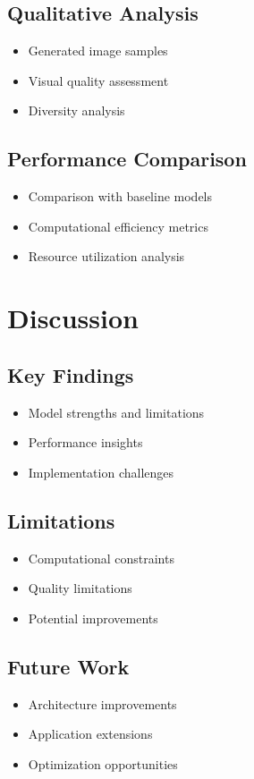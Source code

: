\subsection{Qualitative Analysis}
\begin{itemize}
    \item Generated image samples
    \item Visual quality assessment
    \item Diversity analysis
\end{itemize}

\subsection{Performance Comparison}
\begin{itemize}
    \item Comparison with baseline models
    \item Computational efficiency metrics
    \item Resource utilization analysis
\end{itemize}

\section{Discussion}
\subsection{Key Findings}
\begin{itemize}
    \item Model strengths and limitations
    \item Performance insights
    \item Implementation challenges
\end{itemize}

\subsection{Limitations}
\begin{itemize}
    \item Computational constraints
    \item Quality limitations
    \item Potential improvements
\end{itemize}

\subsection{Future Work}
\begin{itemize}
    \item Architecture improvements
    \item Application extensions
    \item Optimization opportunities
\end{itemize}

